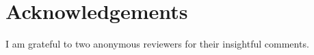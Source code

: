 \documentclass[output=paper,modfonts,newtxmath,hidelinks,]{langscibook}
\begin{document}
\section*{Acknowledgements}

I am grateful to two anonymous reviewers for their insightful comments.

\sloppy
\printbibliography[heading=subbibliography,notkeyword=this]
\end{document}
